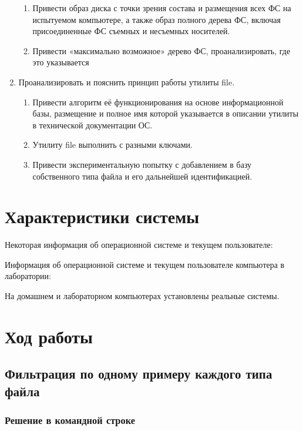\documentclass[14pt,a4paper,report]{report}
\begin{document}
\begin{enumerate}
\begin{enumerate}
		\item Привести образ диска с точки зрения состава и размещения всех ФС на испытуемом компьютере, а также образ полного дерева ФС, включая присоединенные ФС съемных и несъемных носителей. 
		\item Привести «максимально возможное» дерево ФС, проанализировать, где это указывается
	\end{enumerate}
	\item Проанализировать и пояснить принцип работы утилиты file.  
		\begin{enumerate}
			\item Привести алгоритм её функционирования на основе информационной базы, размещение и полное имя которой указывается в описании утилиты в технической документации ОС.
			\item Утилиту file выполнить с разными ключами. 
			\item  Привести экспериментальную попытку с добавлением в базу собственного типа файла и его дальнейшей идентификацией.
		\end{enumerate}
\end{enumerate}

\section{Характеристики системы}

Некоторая информация об операционной системе и текущем пользователе:



Информация об операционной системе и текущем пользователе компьютера в лаборатории:



На домашнем и лабораторном компьютерах установлены реальные системы.

\section{Ход работы}

\subsection{Фильтрация по одному примеру каждого типа файла}

\subsubsection{Решение в командной строке}
\end{document}
